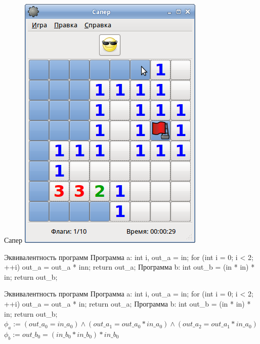 \documentclass{beamer}
\begin{document}
\begin{frame}{Сапер}
\includegraphics[scale=0.4]{Mines.png}
\end{frame}

\begin{frame}{Эквивалентность программ}
Программа a:\newline
int i, out\_a = in;\newline
for (int i = 0; i < 2; ++i) out\_a = out\_a * inn;\newline
return out\_a;\newline
Программа b:\newline
int out\_b = (in * in) * in;\newline
return out\_b;
\end{frame}

\begin{frame}{Эквивалентность программ}
Программа a:\newline
int i, out\_a = in;\newline
for (int i = 0; i < 2; ++i) out\_a = out\_a * in;\newline
return out\_a;\newline
Программа b:\newline
int out\_b = (in * in) * in;\newline
return out\_b;\newline
$\phi_a := (out\_a_0 = in\_a_0) \wedge (out\_a_1 = out\_a_0 * in\_a_0) \wedge (out\_a_2 = out\_a_1 * in\_a_0)$\newline
$\phi_b := out\_b_0 = (in\_b_0 * in\_b_0) * in\_b_0$\newline
\end{frame}
\end{document}
